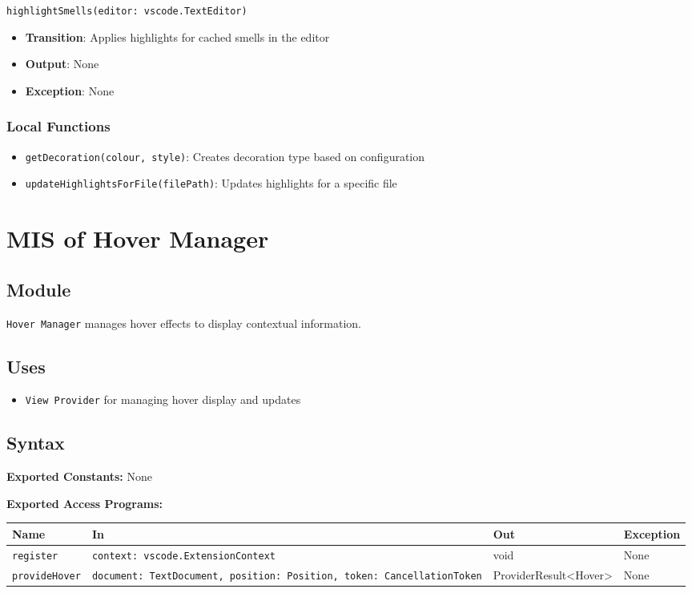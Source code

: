 \documentclass[12pt, titlepage]{article}
\begin{document}
\texttt{highlightSmells(editor: vscode.TextEditor)}
\begin{itemize}
\item \textbf{Transition}: Applies highlights for cached smells in the editor
\item \textbf{Output}: None
\item \textbf{Exception}: None
\end{itemize}

\subsubsection{Local Functions}
\begin{itemize}
\item \texttt{getDecoration(colour, style)}: Creates decoration type based on configuration
\item \texttt{updateHighlightsForFile(filePath)}: Updates highlights for a specific file
\end{itemize}

\section{MIS of Hover Manager}

\subsection{Module}
\texttt{Hover Manager} manages hover effects to display contextual information.

\subsection{Uses}
\begin{itemize}
\item \texttt{View Provider} for managing hover display and updates
\end{itemize}

\subsection{Syntax}

\textbf{Exported Constants:} None

\textbf{Exported Access Programs:}\\
\begin{tabularx}{\linewidth}{|l|>{\raggedright\arraybackslash}X|l|l|}
  \hline
  \textbf{Name} & \textbf{In} & \textbf{Out} & \textbf{Exception} \\
  \hline
  \texttt{register} & \texttt{context: vscode.ExtensionContext} & void & None \\ \hline
  \texttt{provideHover} & \texttt{document: TextDocument, position: Position, token: CancellationToken} & ProviderResult<Hover> & None \\
  \hline
\end{tabularx}
\end{document}
